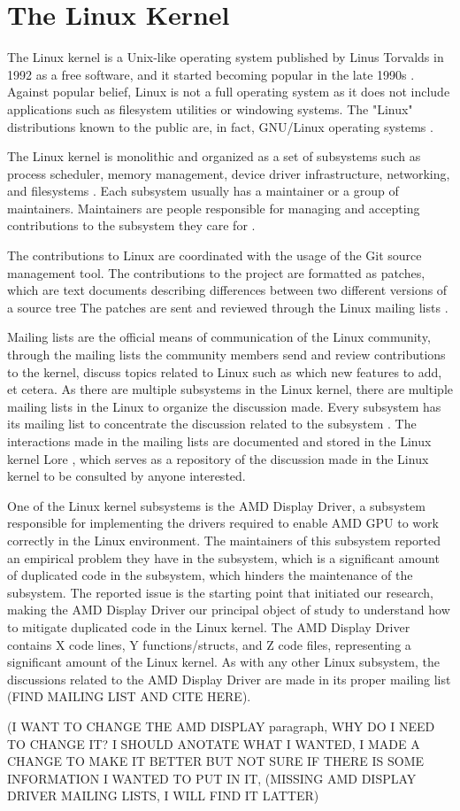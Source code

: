 \en

\section{The Linux Kernel}

The Linux kernel is a Unix-like operating system published by Linus Torvalds in 1992 as a free software, and
it started becoming popular in the late 1990s \citep{linuxbook}. Against popular belief, Linux is not a full 
operating system as it does not include applications such as filesystem utilities or windowing systems. The "Linux" 
distributions known to the public are, in fact, GNU/Linux operating systems \citep{gnuref}.

The Linux kernel is monolithic and organized as a set of subsystems such as process scheduler, memory management, 
device driver infrastructure, networking, and filesystems \citep{melissa}.
Each subsystem usually has a maintainer or a group of maintainers.  Maintainers are people responsible 
for managing and accepting contributions to the subsystem they care for \citep{melissa}.

The contributions to Linux are coordinated with the usage of the Git source management tool.
The contributions to the project are formatted as patches, which are text documents describing differences 
between two different versions of a source tree The patches are sent and reviewed through the 
Linux mailing lists \citep{melissa}.

Mailing lists are the official means of communication of the Linux community, through the mailing lists 
the community members send and review contributions to the kernel, discuss topics related to Linux such as 
which new features to add, et cetera. As there are multiple subsystems in the Linux kernel, there are 
multiple mailing lists in the Linux to organize the discussion made. Every subsystem has its mailing 
list to concentrate the discussion related to the subsystem \citep{melissa}. 
The interactions made in the mailing lists are documented and stored in the Linux kernel Lore
\citep{linuxlore}, which serves as a repository of the discussion made in the Linux kernel to be
consulted by anyone interested.

One of the Linux kernel subsystems is the AMD Display Driver, a subsystem responsible for implementing 
the drivers required to enable AMD GPU to work correctly in the Linux environment. The maintainers of 
this subsystem reported an empirical problem they have in the subsystem, which is a significant amount 
of duplicated code in the subsystem, which hinders the maintenance of the subsystem. The reported issue 
is the starting point that initiated our research, making the AMD Display Driver our principal object 
of study to understand how to mitigate duplicated code in the Linux kernel. The AMD Display Driver 
contains X code lines, Y functions/structs, and Z code files, representing a significant amount of 
the Linux kernel. As with any other Linux subsystem, the discussions related to the AMD Display Driver 
are made in its proper mailing list (FIND MAILING LIST AND CITE HERE).

(I WANT TO CHANGE THE AMD DISPLAY paragraph, WHY DO I NEED TO CHANGE IT? I SHOULD ANOTATE WHAT I WANTED, I MADE A CHANGE
 TO MAKE IT BETTER BUT NOT SURE IF THERE IS SOME INFORMATION I WANTED TO PUT IN IT, 
(MISSING AMD DISPLAY DRIVER MAILING LISTS, I WILL FIND IT LATTER)

